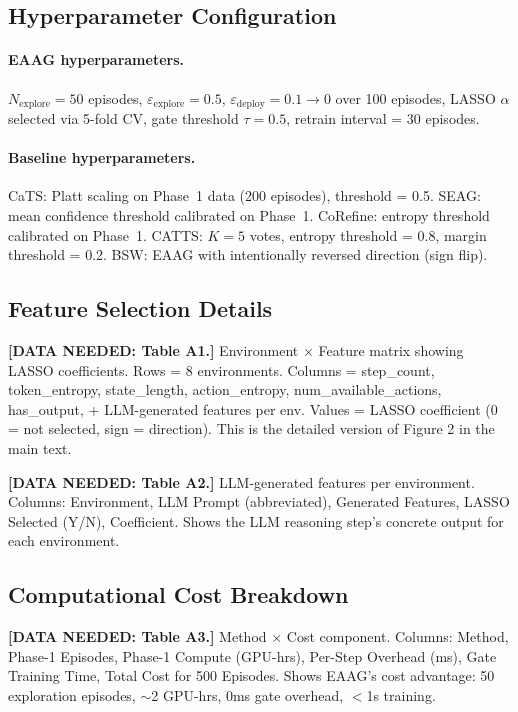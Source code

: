 \subsection{Hyperparameter Configuration}

\paragraph{EAAG hyperparameters.}
$N_{\text{explore}} = 50$ episodes,
$\varepsilon_{\text{explore}} = 0.5$,
$\varepsilon_{\text{deploy}} = 0.1 \to 0$ over 100 episodes,
LASSO $\alpha$ selected via 5-fold CV,
gate threshold $\tau = 0.5$,
retrain interval = 30 episodes.

\paragraph{Baseline hyperparameters.}
CaTS: Platt scaling on Phase~1 data (200 episodes), threshold = 0.5.
SEAG: mean confidence threshold calibrated on Phase~1.
CoRefine: entropy threshold calibrated on Phase~1.
CATTS: $K{=}5$ votes, entropy threshold = 0.8, margin threshold = 0.2.
BSW: EAAG with intentionally reversed direction (sign flip).

\subsection{Feature Selection Details}
\label{app:features}

{\color{blue} \textbf{[DATA NEEDED: Table A1.]} Environment $\times$ Feature
matrix showing LASSO coefficients. Rows = 8 environments.
Columns = step\_count, token\_entropy, state\_length, action\_entropy,
num\_available\_actions, has\_output, + LLM-generated features per env.
Values = LASSO coefficient (0 = not selected, sign = direction).
This is the detailed version of Figure 2 in the main text.}

{\color{blue} \textbf{[DATA NEEDED: Table A2.]} LLM-generated features per
environment. Columns: Environment, LLM Prompt (abbreviated), Generated
Features, LASSO Selected (Y/N), Coefficient. Shows the LLM reasoning
step's concrete output for each environment.}

\subsection{Computational Cost Breakdown}

{\color{blue} \textbf{[DATA NEEDED: Table A3.]} Method $\times$ Cost component.
Columns: Method, Phase-1 Episodes, Phase-1 Compute (GPU-hrs),
Per-Step Overhead (ms), Gate Training Time, Total Cost for 500 Episodes.
Shows EAAG's cost advantage: 50 exploration episodes, $\sim$2 GPU-hrs,
0ms gate overhead, $<$1s training.}


